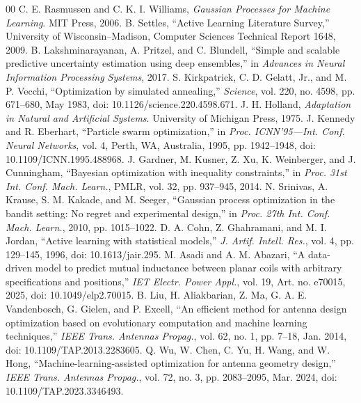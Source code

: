 \documentclass[conference]{IEEEtran}
\begin{document}
\balance
\begin{thebibliography}{00}
\fontsize{6.5}{7.1}\selectfont
{} C. E. Rasmussen and C. K. I. Williams, \emph{Gaussian Processes for Machine Learning}. MIT Press, 2006.
 B. Settles, ``Active Learning Literature Survey,'' University of Wisconsin--Madison, Computer Sciences Technical Report 1648, 2009.
 B. Lakshminarayanan, A. Pritzel, and C. Blundell, ``Simple and scalable predictive uncertainty estimation using deep ensembles,'' in \emph{Advances in Neural Information Processing Systems}, 2017.
 S. Kirkpatrick, C. D. Gelatt, Jr., and M. P. Vecchi, ``Optimization by simulated annealing,'' \emph{Science}, vol. 220, no. 4598, pp. 671--680, May 1983, doi: 10.1126/science.220.4598.671.
 J. H. Holland, \emph{Adaptation in Natural and Artificial Systems}. University of Michigan Press, 1975.
 J. Kennedy and R. Eberhart, ``Particle swarm optimization,'' in \emph{Proc. ICNN'95---Int. Conf. Neural Networks}, vol. 4, Perth, WA, Australia, 1995, pp. 1942--1948, doi: 10.1109/ICNN.1995.488968.
 J. Gardner, M. Kusner, Z. Xu, K. Weinberger, and J. Cunningham, ``Bayesian optimization with inequality constraints,'' in \emph{Proc. 31st Int. Conf. Mach. Learn.}, PMLR, vol. 32, pp. 937--945, 2014.
 N. Srinivas, A. Krause, S. M. Kakade, and M. Seeger, ``Gaussian process optimization in the bandit setting: No regret and experimental design,'' in \emph{Proc. 27th Int. Conf. Mach. Learn.}, 2010, pp. 1015--1022.
 D. A. Cohn, Z. Ghahramani, and M. I. Jordan, ``Active learning with statistical models,'' \emph{J. Artif. Intell. Res.}, vol. 4, pp. 129--145, 1996, doi: 10.1613/jair.295.
 M. Asadi and A. M. Abazari, ``A data-driven model to predict mutual inductance between planar coils with arbitrary specifications and positions,'' \emph{IET Electr. Power Appl.}, vol. 19, Art. no. e70015, 2025, doi: 10.1049/elp2.70015.
 B. Liu, H. Aliakbarian, Z. Ma, G. A. E. Vandenbosch, G. Gielen, and P. Excell, ``An efficient method for antenna design optimization based on evolutionary computation and machine learning techniques,'' \emph{IEEE Trans. Antennas Propag.}, vol. 62, no. 1, pp. 7--18, Jan. 2014, doi: 10.1109/TAP.2013.2283605.
 Q. Wu, W. Chen, C. Yu, H. Wang, and W. Hong, ``Machine-learning-assisted optimization for antenna geometry design,'' \emph{IEEE Trans. Antennas Propag.}, vol. 72, no. 3, pp. 2083--2095, Mar. 2024, doi: 10.1109/TAP.2023.3346493.

\end{thebibliography}
\end{document}
